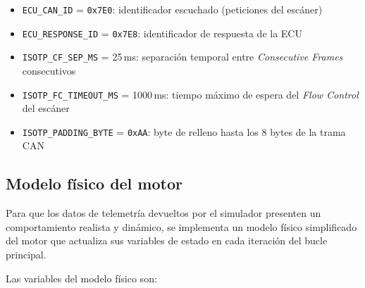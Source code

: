 \begin{itemize}
    \item \texttt{ECU\_CAN\_ID} = \texttt{0x7E0}: identificador escuchado (peticiones del escáner)
    \item \texttt{ECU\_RESPONSE\_ID} = \texttt{0x7E8}: identificador de respuesta de la ECU
    \item \texttt{ISOTP\_CF\_SEP\_MS} = 25\,ms: separación temporal entre \textit{Consecutive Frames} consecutivos
    \item \texttt{ISOTP\_FC\_TIMEOUT\_MS} = 1000\,ms: tiempo máximo de espera del \textit{Flow Control} del escáner
    \item \texttt{ISOTP\_PADDING\_BYTE} = \texttt{0xAA}: byte de relleno hasta los 8 bytes de la trama CAN
\end{itemize}


\subsection{Modelo físico del motor}

Para que los datos de telemetría devueltos por el simulador presenten un comportamiento realista y dinámico, se implementa un modelo físico simplificado del motor que actualiza sus variables de estado en cada iteración del bucle principal.

Las variables del modelo físico son:

